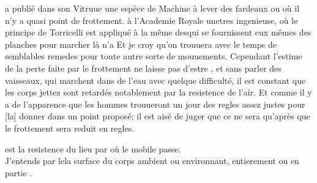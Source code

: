 a publi\'{e} dans son Vitruue\protect{}
une esp\`{e}ce de Machine \`{a} lever des fardeaux ou o\`{u} il n'y a quasi point de frottement.
\`{a} l'Academie Royale\protect{}
unetres ingenieuse,
o\`{u} le principe de Torricelli\protect{}
est appliqu\'{e} \`{a} la m\^{e}me
desqui se fournissent eux m\^{e}mes des planches pour marcher l\`{a}
n'a 
Et je croy qu'on trouuera avec le temps de semblables remedes pour toute autre
sorte de mouuements. Cependant l'estime de la perte faite par le frottement ne laisse pas
d'estre ,
et sans parler des vaisseaux, qui marchent dans de l'eau avec quelque difficult\'{e}, il est
constant que les corps jettez\protect{} sont retard\'{e}s notablement par la resistence de l'air\protect{}.
Et comme il y a de l'apparence que les hommes trouueront un jour des regles assez justes pour [la]
donner dans un point propos\'{e}; il est ais\'{e} de juger que ce ne sera qu'apr\`{e}s que le frottement sera reduit
en regles.
\pend
\count{}
\vspace*{3mm} 
\begin{Geometrico}
 est la resistence du lieu\protect{} par o\`{u} le mobile passe.\\%
J'entends par lela surface du corps ambient ou environnant,
entierement ou en partie
.
\end{Geometrico}
